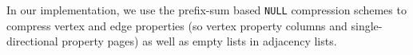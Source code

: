 In our implementation, we use the prefix-sum based \texttt{NULL} compression schemes to compress vertex and edge properties (so vertex property columns and single-directional property pages) as well as empty lists in adjacency lists.  
















